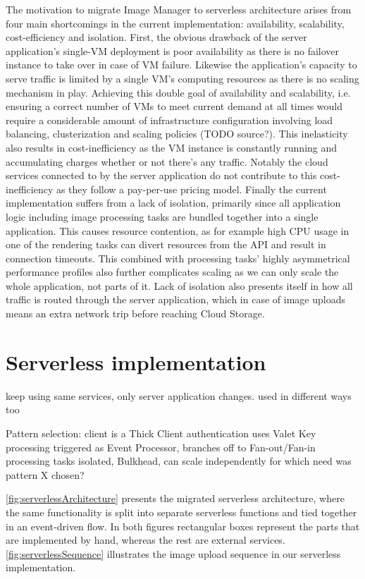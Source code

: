 The motivation to migrate Image Manager to serverless architecture arises from four main shortcomings in the current implementation: availability, scalability, cost-efficiency and isolation. First, the obvious drawback of the server application's single-VM deployment is poor availability as there is no failover instance to take over in case of VM failure. Likewise the application's capacity to serve traffic is limited by a single VM's computing resources as there is no scaling mechanism in play. Achieving this double goal of availability and scalability, i.e. ensuring a correct number of VMs to meet current demand at all times would require a considerable amount of infrastructure configuration involving load balancing, clusterization and scaling policies (TODO source?). This inelasticity also results in cost-inefficiency as the VM instance is constantly running and accumulating charges whether or not there's any traffic. Notably the cloud services connected to by the server application do not contribute to this cost-inefficiency as they follow a pay-per-use pricing model. Finally the current implementation suffers from a lack of isolation, primarily since all application logic including image processing tasks are bundled together into a single application. This causes resource contention, as for example high CPU usage in one of the rendering tasks can divert resources from the API and result in connection timeouts. This combined with processing tasks' highly asymmetrical performance profiles also further complicates scaling as we can only scale the whole application, not parts of it. Lack of isolation also presents itself in how all traffic is routed through the server application, which in case of image uploads means an extra network trip before reaching Cloud Storage.

\section{Serverless implementation}

keep using same services, only server application changes. used in different ways too

Pattern selection:
client is a Thick Client
authentication uses Valet Key
processing triggered as Event Processor, branches off to Fan-out/Fan-in
processing tasks isolated, Bulkhead, can scale independently
for which need was pattern X chosen?

\ref{fig:serverlessArchitecture} presents the migrated serverless architecture, where the same functionality is split into separate serverless functions and tied together in an event-driven flow. In both figures rectangular boxes represent the parts that are implemented by hand, whereas the rest are external services. \ref{fig:serverlessSequence} illustrates the image upload sequence in our serverless implementation.


